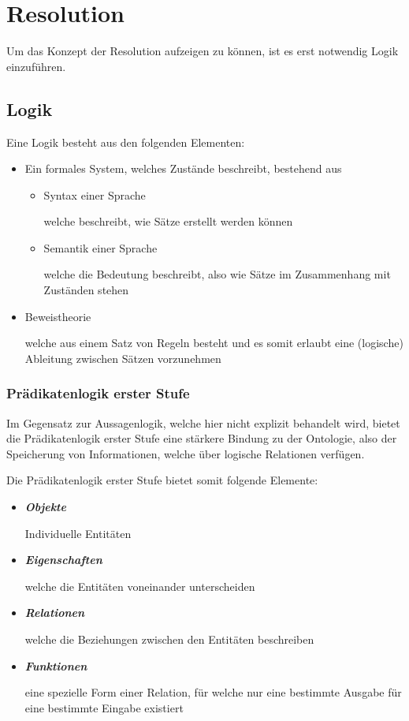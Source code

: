 \chapter{Resolution}
\label{chap:resolution}

Um das Konzept der Resolution aufzeigen zu können, ist es erst notwendig Logik einzuführen.

\section{Logik}
\label{sec:logik}

Eine Logik besteht aus den folgenden Elementen:

\begin{itemize}
    \item{Ein formales System, welches Zustände beschreibt, bestehend aus}
    \begin{itemize}
        \item{Syntax einer Sprache

        welche beschreibt, wie Sätze erstellt werden können}
        \item{Semantik einer Sprache

        welche die Bedeutung beschreibt, also wie Sätze im Zusammenhang mit Zuständen stehen}
    \end{itemize}
    \item{Beweistheorie

        welche aus einem Satz von Regeln besteht und es somit erlaubt eine (logische) Ableitung zwischen Sätzen vorzunehmen
    }
\end{itemize}

\subsection{Prädikatenlogik erster Stufe}
\label{subsec:prädikatenlogik}

Im Gegensatz zur Aussagenlogik, welche hier nicht explizit behandelt wird, bietet die Prädikatenlogik erster Stufe eine stärkere Bindung zu der Ontologie, also der Speicherung von Informationen, welche über logische Relationen verfügen.~\cite[S. 185]{russel}

Die Prädikatenlogik erster Stufe bietet somit folgende Elemente:
\begin{itemize}
    \item{\textbf{\textit{Objekte}}

        Individuelle Entitäten
    }
    \item{\textbf{\textit{Eigenschaften}}

        welche die Entitäten voneinander unterscheiden
    }
    \item{\textbf{\textit{Relationen}}

        welche die Beziehungen zwischen den Entitäten beschreiben
    }
    \item{\textbf{\textit{Funktionen}}

        eine spezielle Form einer Relation, für welche nur eine bestimmte Ausgabe für eine bestimmte Eingabe existiert
    }
\end{itemize}

